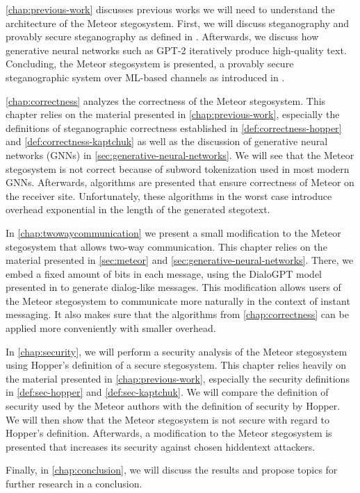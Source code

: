 \autoref{chap:previous-work} discusses previous works we will need to understand the architecture of the Meteor stegosystem.
First, we will discuss steganography and provably secure steganography as defined in \cite{Hopper2004}.
Afterwards, we discuss how generative neural networks such as GPT-2 iteratively produce high-quality text.
Concluding, the Meteor stegosystem is presented, a provably secure steganographic system over ML-based channels as introduced in \cite{Meteor2021}.

\autoref{chap:correctness} analyzes the correctness of the Meteor stegosystem. 
This chapter relies on the material presented in \autoref{chap:previous-work}, especially the definitions of steganographic correctness established in \autoref{def:correctness-hopper} and \autoref{def:correctness-kaptchuk} as well as the discussion of generative neural networks (GNNs) in \autoref{sec:generative-neural-networks}.
We will see that the Meteor stegosystem is not correct because of subword tokenization used in most modern GNNs.
Afterwards, algorithms are presented that ensure correctness of Meteor on the receiver site.
Unfortunately, these algorithms in the worst case introduce overhead exponential in the length of the generated stegotext.

In \autoref{chap:twowaycommunication} we present a small modification to the Meteor stegosystem that allows two-way communication.
This chapter relies on the material presented in \autoref{sec:meteor} and \autoref{sec:generative-neural-networks}.
There, we embed a fixed amount of bits in each message, using the DialoGPT model presented in \cite{Zhang2020} to generate dialog-like messages.
This modification allows users of the Meteor stegosystem to communicate more naturally in the context of instant messaging.
It also makes sure that the algorithms from \autoref{chap:correctness} can be applied more conveniently with smaller overhead.

In \autoref{chap:security}, we will perform a security analysis of the Meteor stegosystem using Hopper's definition of a secure stegosystem.
This chapter relies heavily on the material presented in \autoref{chap:previous-work}, especially the security definitions in \autoref{def:sec-hopper} and \autoref{def:sec-kaptchuk}.
We will compare the definition of security used by the Meteor authors with the definition of security by Hopper.
We will then show that the Meteor stegosystem is not secure with regard to Hopper's definition.
Afterwards, a modification to the Meteor stegosystem is presented that increases its security against chosen hiddentext attackers.

Finally, in \autoref{chap:conclusion}, we will discuss the results and propose topics for further research in a conclusion.